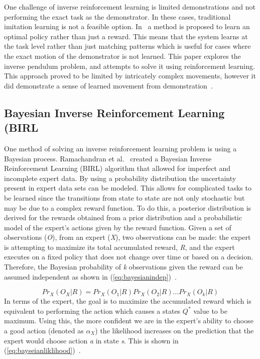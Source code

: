 \documentclass[12pt,american]{report}
\begin{document}
		One challenge of inverse reinforcement learning is limited demonstrations and not performing the exact task as the demonstrator. In these cases, traditional imitation learning is not a feasible option. In~\cite{atkeson1997robot} a method is proposed to learn an optimal policy rather than just a reward. This means that the system learns at the task level rather than just matching patterns which is useful for cases where the exact motion of the demonstrator is not learned. This paper explores the inverse pendulum problem, and attempts to solve it using reinforcement learning. This approach proved to be limited by intricately complex movements, however it did demonstrate a sense of learned movement from demonstration~\cite{atkeson1997robot}.

\subsection{Bayesian Inverse Reinforcement Learning (BIRL}
One method of solving an inverse reinforcement learning problem is using a Bayesian process. Ramachandran et al.~\cite{ramachandran2007bayesian} created a Bayesian Inverse Reinforcement Learning (BIRL) algorithm that allowed for imperfect and incomplete expert data.  By using a probability distribution the uncertainty present in expert data sets can be modeled. This allows for complicated tasks to be learned since the transitions from state to state are not only stochastic but may be due to a complex reward function. To do this, a posterior distribution is derived for the rewards obtained from a prior distribution and a probabilistic model of the expert's actions given by the reward function.  Given a set of observations (\textit{O}), from an expert (\textit{X}), two observations can be made: the expert is attempting to maximize its total accumulated reward, \textit{R}, and the expert executes on a fixed policy that does not change over time or based on a decision. Therefore, the Bayesian probability of \textit{k} observations given the reward can be assumed independent as shown in (\ref{eq:bayesianindep})~\cite{ramachandran2007bayesian}.

\begin{equation}
            \label{eq:bayesianindep}
            Pr_X(O_X|R) = Pr_X(O_1|R)Pr_X(O_2|R)...Pr_X(O_k|R)%
        \end{equation}
In terms of the expert, the goal is to maximize the accumulated reward which is equivalent to performing the action which causes a states \textit{$Q^*$} value to be maximum. Using this, the more confident we are in the expert's ability to choose a good action (denoted as $\alpha_X$) the likelihood increases on the prediction that the expert would choose action \textit{a} in state \textit{s}.  This is shown in (\ref{eq:bayseianliklihood})~\cite{ramachandran2007bayesian}.
\end{document}
